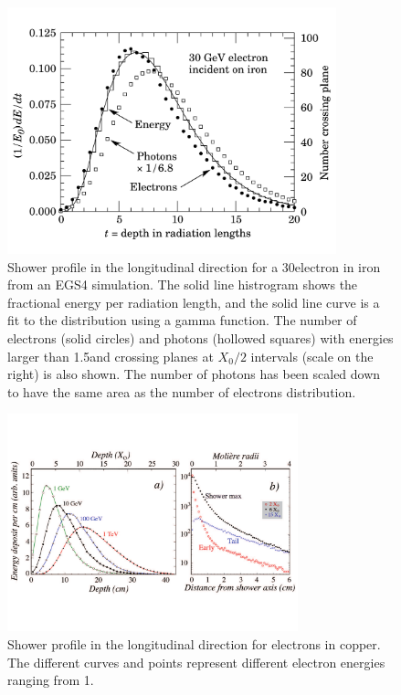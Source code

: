 \begin{figure}[h] \centering
\includegraphics[width=0.85\textwidth]{calorimetry/EGS4_Simulation.pdf}
\caption{Shower profile in the longitudinal direction for
a 30\GeV electron in iron from an EGS4 simulation. The solid line
histrogram shows the fractional energy per radiation length, and the
solid line curve is a fit to the distribution using a gamma
function. The number of electrons (solid circles) and photons
(hollowed squares) with energies larger than 1.5\MeV and crossing
planes at $X_{0}/2$ intervals (scale on the right) is also shown. The
number of photons has been scaled down to have the same area as the
number of electrons distribution.}
\label{fig:showerProfile1}
\end{figure} 
\begin{figure}[h] \centering
\includegraphics[width=0.75\textwidth]{calorimetry/ShowerProfile_Left.pdf}
\caption{Shower profile in the longitudinal direction for
electrons in copper. The different curves and points represent
different electron energies ranging from 1\TeV.}
\label{fig:showerProfile2}
\end{figure} 

